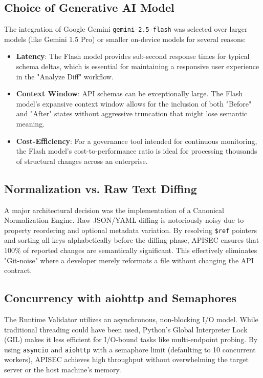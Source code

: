 \documentclass{fisatprojectfinal}
\begin{document}
\subsection{Choice of Generative AI Model}
The integration of Google Gemini \texttt{gemini-2.5-flash} was selected over larger models (like Gemini 1.5 Pro) or smaller on-device models for several reasons:
\begin{itemize}
    \item \textbf{Latency}: The Flash model provides sub-second response times for typical schema deltas, which is essential for maintaining a responsive user experience in the "Analyze Diff" workflow.
    \item \textbf{Context Window}: API schemas can be exceptionally large. The Flash model's expansive context window allows for the inclusion of both "Before" and "After" states without aggressive truncation that might lose semantic meaning.
    \item \textbf{Cost-Efficiency}: For a governance tool intended for continuous monitoring, the Flash model's cost-to-performance ratio is ideal for processing thousands of structural changes across an enterprise.
\end{itemize}

\subsection{Normalization vs. Raw Text Diffing}
A major architectural decision was the implementation of a Canonical Normalization Engine. Raw JSON/YAML diffing is notoriously noisy due to property reordering and optional metadata variation. By resolving \texttt{\$ref} pointers and sorting all keys alphabetically before the diffing phase, APISEC ensures that 100\% of reported changes are semantically significant. This effectively eliminates "Git-noise" where a developer merely reformats a file without changing the API contract.

\subsection{Concurrency with aiohttp and Semaphores}
The Runtime Validator utilizes an asynchronous, non-blocking I/O model. While traditional threading could have been used, Python's Global Interpreter Lock (GIL) makes it less efficient for I/O-bound tasks like multi-endpoint probing. By using \texttt{asyncio} and \texttt{aiohttp} with a semaphore limit (defaulting to 10 concurrent workers), APISEC achieves high throughput without overwhelming the target server or the host machine's memory.
\end{document}
